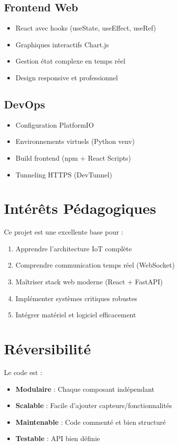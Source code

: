 \documentclass[12pt,french]{report}
\begin{document}
\subsection{Frontend Web}
\begin{itemize}
    \item React avec hooks (useState, useEffect, useRef)
    \item Graphiques interactifs Chart.js
    \item Gestion état complexe en temps réel
    \item Design responsive et professionnel
\end{itemize}

\subsection{DevOps}
\begin{itemize}
    \item Configuration PlatformIO
    \item Environnements virtuels (Python venv)
    \item Build frontend (npm + React Scripts)
    \item Tunneling HTTPS (DevTunnel)
\end{itemize}

\section{Intérêts Pédagogiques}

Ce projet est une excellente base pour :

\begin{enumerate}
    \item Apprendre l'architecture IoT complète
    \item Comprendre communication temps réel (WebSocket)
    \item Maîtriser stack web moderne (React + FastAPI)
    \item Implémenter systèmes critiques robustes
    \item Intégrer matériel et logiciel efficacement
\end{enumerate}

\section{Réversibilité}

Le code est :
\begin{itemize}
    \item \textbf{Modulaire} : Chaque composant indépendant
    \item \textbf{Scalable} : Facile d'ajouter capteurs/fonctionnalités
    \item \textbf{Maintenable} : Code commenté et bien structuré
    \item \textbf{Testable} : API bien définie
\end{itemize}
\end{document}

